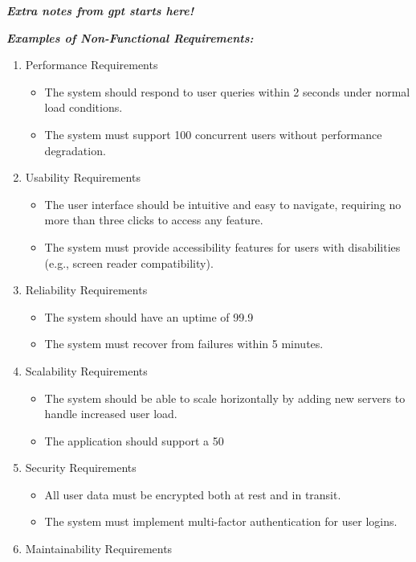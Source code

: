 \documentclass[a4paper]{article}
\begin{document}
\vspace{0.5 cm}
\textbf{\textit{Extra notes from gpt starts here! }}

\textbf{\textit{Examples of Non-Functional Requirements:}}

\begin{enumerate}
        \item Performance Requirements
\begin{itemize}
        \item The system should respond to user queries within 2 seconds under normal load conditions.
        \item The system must support 100 concurrent users without performance degradation.
\end{itemize}
        \item Usability Requirements

\begin{itemize}
        \item The user interface should be intuitive and easy to navigate, requiring no more than three clicks to access any feature.
        \item The system must provide accessibility features for users with disabilities (e.g., screen reader compatibility).
\end{itemize}
        \item Reliability Requirements

\begin{itemize}
        \item The system should have an uptime of 99.9%
        \item The system must recover from failures within 5 minutes.
\end{itemize}
        \item Scalability Requirements

\begin{itemize}
        \item The system should be able to scale horizontally by adding new servers to handle increased user load.
        \item The application should support a 50%
\end{itemize}
        \item Security Requirements
\begin{itemize}

        \item All user data must be encrypted both at rest and in transit.
        \item The system must implement multi-factor authentication for user logins.
\end{itemize}
        \item Maintainability Requirements


\end{enumerate}
\end{document}
